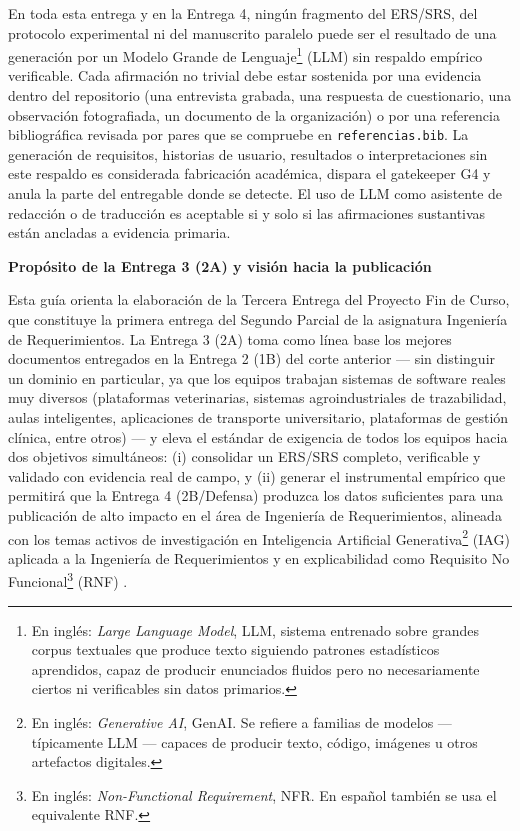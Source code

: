 \documentclass[11pt,a4paper]{article}
\newcounter{secc}
\newcommand{\secband}[1]{%
    \stepcounter{secc}\par\vspace{9pt}\noindent
    {\setlength{\fboxsep}{0pt}%
        \colorbox{uteqgold}{\parbox[c][20pt][c]{0.05\textwidth}{\centering\textbf{\color{white}\small \arabic{secc}}}}%
        \colorbox{uteqgreen}{\parbox[c][20pt][c]{0.95\textwidth}{\hspace{8pt}\textbf{\color{white}\small #1}}}%
    }\par\vspace{5pt}}
\begin{document}
\begin{alertbox}[title=Advertencia global sobre la generación de texto sin evidencia empírica]
En toda esta entrega y en la Entrega 4, ningún fragmento del ERS/SRS, del protocolo experimental ni del manuscrito paralelo puede ser el resultado de una generación por un Modelo Grande de Lenguaje\footnote{En inglés: \emph{Large Language Model}, LLM, sistema entrenado sobre grandes corpus textuales que produce texto siguiendo patrones estadísticos aprendidos, capaz de producir enunciados fluidos pero no necesariamente ciertos ni verificables sin datos primarios.} (LLM) sin respaldo empírico verificable. Cada afirmación no trivial debe estar sostenida por una evidencia dentro del repositorio (una entrevista grabada, una respuesta de cuestionario, una observación fotografiada, un documento de la organización) o por una referencia bibliográfica revisada por pares que se compruebe en \texttt{referencias.bib}. La generación de requisitos, historias de usuario, resultados o interpretaciones sin este respaldo es considerada fabricación académica, dispara el gatekeeper G4 y anula la parte del entregable donde se detecte. El uso de LLM como asistente de redacción o de traducción es aceptable si y solo si las afirmaciones sustantivas están ancladas a evidencia primaria.
\end{alertbox}

\secband{Propósito de la Entrega 3 (2A) y visión hacia la publicación}

Esta guía orienta la elaboración de la Tercera Entrega del Proyecto Fin de Curso, que constituye la primera entrega del Segundo Parcial de la asignatura Ingeniería de Requerimientos.
La Entrega 3 (2A) toma como línea base los mejores documentos entregados en la Entrega 2 (1B) del corte anterior --- sin distinguir un dominio en particular, ya que los equipos trabajan sistemas de software reales muy diversos (plataformas veterinarias, sistemas agroindustriales de trazabilidad, aulas inteligentes, aplicaciones de transporte universitario, plataformas de gestión clínica, entre otros) --- y eleva el estándar de exigencia de todos los equipos hacia dos objetivos simultáneos: (i) consolidar un ERS/SRS completo, verificable y validado con evidencia real de campo, y (ii) generar el instrumental empírico que permitirá que la Entrega 4 (2B/Defensa) produzca los datos suficientes para una publicación de alto impacto en el área de Ingeniería de Requerimientos, alineada con los temas activos de investigación en Inteligencia Artificial Generativa\footnote{En inglés: \emph{Generative AI}, GenAI. Se refiere a familias de modelos --- típicamente LLM --- capaces de producir texto, código, imágenes u otros artefactos digitales.} (IAG) aplicada a la Ingeniería de Requerimientos \cite{cheng2026genai,arora2024llm4re,vogelsang2024llm} y en explicabilidad como Requisito No Funcional\footnote{En inglés: \emph{Non-Functional Requirement}, NFR. En español también se usa el equivalente RNF.} (RNF) \cite{chazette2020nfr,chazette2021exploring,chazette2022explainable}.
\end{document}
